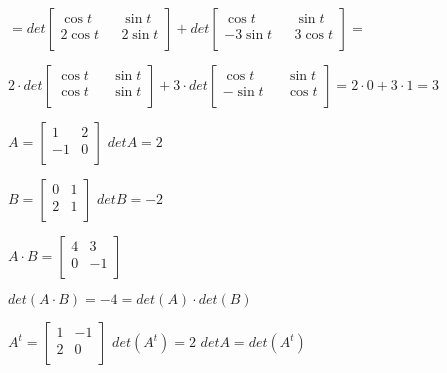 \documentclass{article}
\begin{document}
$ = det \begin{bmatrix}
    \cos t && \sin t \\
    2\cos t && 2\sin t \\
\end{bmatrix}
+ det \begin{bmatrix}
    \cos t && \sin t \\
    -3\sin t && 3\cos t \\
\end{bmatrix} = 
$\bigbreak

$2 \cdot det \begin{bmatrix}
    \cos t && \sin t \\
    \cos t && \sin t \\
\end{bmatrix}
+ 3\cdot det\begin{bmatrix}
    \cos t && \sin t \\
    -\sin t && \cos t \\
\end{bmatrix} 
= 2\cdot 0 + 3 \cdot 1 = 3
$


$A = \begin{bmatrix}
    1 & 2 \\
    -1 & 0 \\
\end{bmatrix}
$ \bigbreak $det A = 2$
\bigbreak

$B = \begin{bmatrix}
    0 & 1 \\
    2 & 1 \\
\end{bmatrix}
$
\bigbreak $det B = -2$

$A \cdot B = \begin{bmatrix}
    4 & 3 \\
    0 & -1 \\
\end{bmatrix}
$

\bigbreak

$det ( A \cdot B ) = -4 = det(A) \cdot det(B)$

\bigbreak

$A^t  = \begin{bmatrix}
    1 & -1 \\
    2 & 0 \\
\end{bmatrix}
$
\bigbreak
$det (A^t) = 2$
\bigbreak
$detA = det(A^t)$
\end{document}
